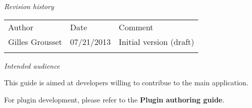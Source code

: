 \emph{Revision history}

\begin{longtable}[c]{@{}lll@{}}
\hline\noalign{\medskip}
Author & Date & Comment
\\\noalign{\medskip}
\hline\noalign{\medskip}
Gilles Grousset & 07/21/2013 & Initial version (draft)
\\\noalign{\medskip}
\hline
\end{longtable}

\emph{Intended audience}

This guide is aimed at developers willing to contribue to the main
application.

For plugin development, please refer to the \textbf{Plugin authoring
guide}.
